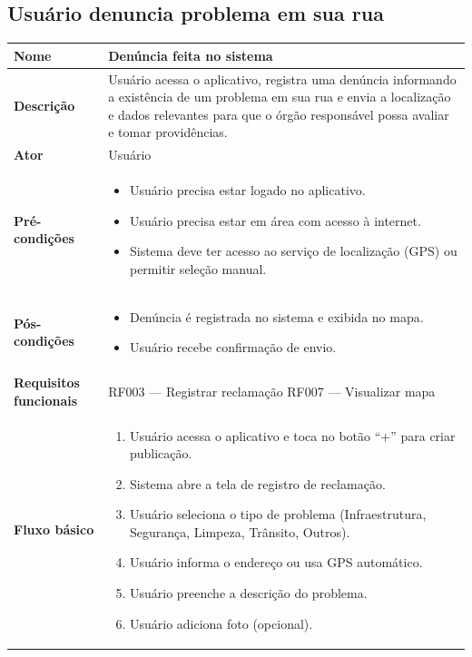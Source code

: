 \subsection{Usuário denuncia problema em sua rua}

\begin{longtable}{|p{4cm}|p{10cm}|}
  \hline
  \textbf{Nome} & Denúncia feita no sistema \\
  \hline
  \textbf{Descrição} & Usuário acessa o aplicativo, registra uma denúncia informando a existência de um problema em sua rua e envia a localização e dados relevantes para que o órgão responsável possa avaliar e tomar providências. \\
  \hline
  \textbf{Ator} & Usuário \\
  \hline
  \textbf{Pré-condições} &
    \begin{itemize}
      \item Usuário precisa estar logado no aplicativo.
      \item Usuário precisa estar em área com acesso à internet.
      \item Sistema deve ter acesso ao serviço de localização (GPS) ou permitir seleção manual.
    \end{itemize} \\
  \hline
  \textbf{Pós-condições} &
    \begin{itemize}
      \item Denúncia é registrada no sistema e exibida no mapa.
      \item Usuário recebe confirmação de envio.
    \end{itemize} \\
  \hline
  \textbf{Requisitos funcionais} & RF003 — Registrar reclamação \newline RF007 — Visualizar mapa \\
  \hline
  \textbf{Fluxo básico} &
    \begin{enumerate}
      \item Usuário acessa o aplicativo e toca no botão ``+'' para criar publicação.
      \item Sistema abre a tela de registro de reclamação.
      \item Usuário seleciona o tipo de problema (Infraestrutura, Segurança, Limpeza, Trânsito, Outros).
      \item Usuário informa o endereço ou usa GPS automático.
      \item Usuário preenche a descrição do problema.
      \item Usuário adiciona foto (opcional).

\end{enumerate}
\end{longtable}
